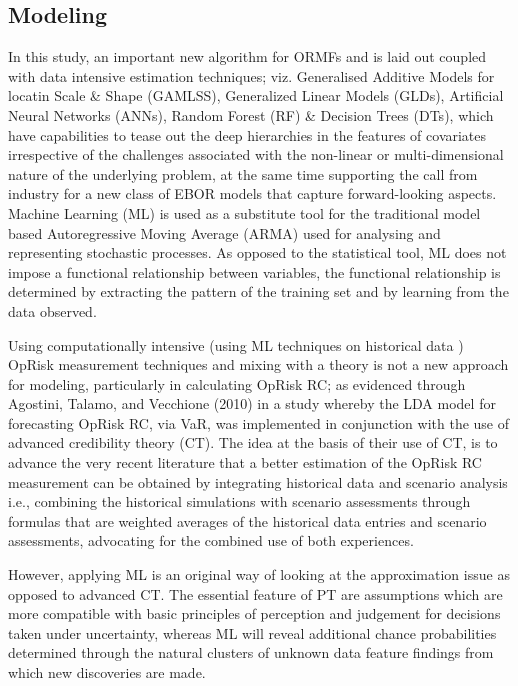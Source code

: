 \documentclass[]{DissertateUSU}
\begin{document}
\subsection{Modeling}

In this study, an important new algorithm for ORMFs and is laid out
coupled with data intensive estimation techniques; viz. Generalised
Additive Models for locatin Scale \& Shape (GAMLSS), Generalized Linear
Models (GLDs), Artificial Neural Networks (ANNs), Random Forest (RF) \&
Decision Trees (DTs), which have capabilities to tease out the deep
hierarchies in the features of covariates irrespective of the challenges
associated with the non-linear or multi-dimensional nature of the
underlying problem, at the same time supporting the call from industry
for a new class of EBOR models that capture forward-looking aspects.
Machine Learning (ML) is used as a substitute tool for the traditional
model based Autoregressive Moving Average (ARMA) used for analysing and
representing stochastic processes. As opposed to the statistical tool,
ML does not impose a functional relationship between variables, the
functional relationship is determined by extracting the pattern of the
training set and by learning from the data observed.\medskip 

Using computationally intensive (using ML techniques on historical data
) OpRisk measurement techniques and mixing with a theory is not a new
approach for modeling, particularly in calculating OpRisk RC; as
evidenced through Agostini, Talamo, and Vecchione (2010) in a study
whereby the LDA model for forecasting OpRisk RC, via VaR, was
implemented in conjunction with the use of advanced credibility theory
(CT). The idea at the basis of their use of CT, is to advance the very
recent literature that a better estimation of the OpRisk RC measurement
can be obtained by integrating historical data and scenario analysis
i.e., combining the historical simulations with scenario assessments
through formulas that are weighted averages of the historical data
entries and scenario assessments, advocating for the combined use of
both experiences.\medskip 

However, applying ML is an original way of looking at the approximation
issue as opposed to advanced CT. The essential feature of PT are
assumptions which are more compatible with basic principles of
perception and judgement for decisions taken under uncertainty, whereas
ML will reveal additional chance probabilities determined through the
natural clusters of unknown data feature findings from which new
discoveries are made.\medskip
\end{document}
